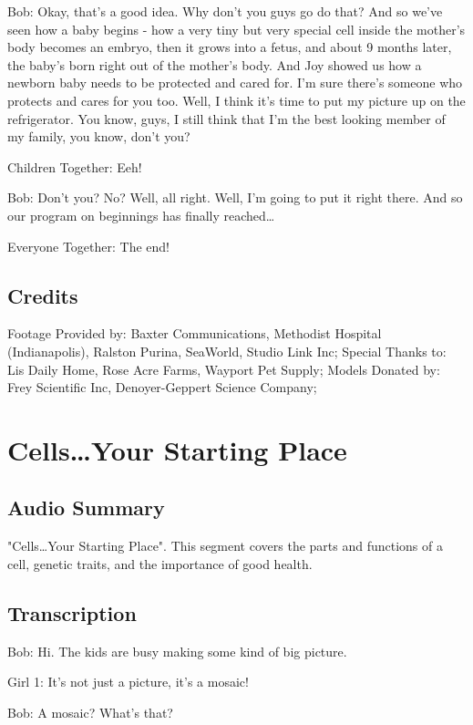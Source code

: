 Bob: Okay, that's a good idea. Why don't you guys go do that? And so we've seen how a baby begins - how a very tiny but very special cell inside the mother's body becomes an embryo, then it grows into a fetus, and about 9 months later, the baby's born right out of the mother's body. And Joy showed us how a newborn baby needs to be protected and cared for. I'm sure there's someone who protects and cares for you too. Well, I think it's time to put my picture up on the refrigerator. You know, guys, I still think that I'm the best looking member of my family, you know, don't you?

Children Together: Eeh!

Bob: Don't you? No? Well, all right. Well, I'm going to put it right there. And so our program on beginnings has finally reached\dots

Everyone Together: The end!

\subsection{Credits}

Footage Provided by: Baxter Communications, Methodist Hospital (Indianapolis), Ralston Purina, SeaWorld, Studio Link Inc;
Special Thanks to: Lis Daily Home, Rose Acre Farms, Wayport Pet Supply;
Models Donated by: Frey Scientific Inc, Denoyer-Geppert Science Company;

\section{Cells\dots Your Starting Place}

\subsection{Audio Summary}

"Cells\dots Your Starting Place". This segment covers the parts and functions of a cell, genetic traits, and the importance of good health.

\subsection{Transcription}

Bob: Hi. The kids are busy making some kind of big picture.

Girl 1: It's not just a picture, it's a mosaic!

Bob: A mosaic? What's that?

